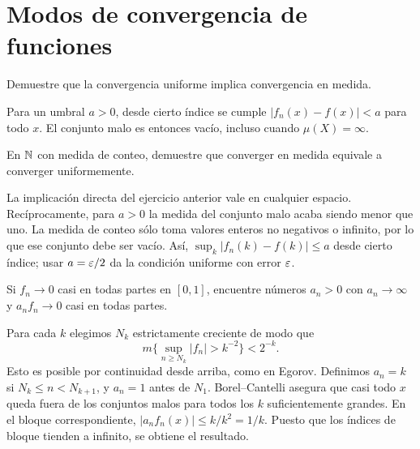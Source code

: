 \chapter{Modos de convergencia de funciones}

\begin{ejercicio}\label{ej:v2-l14-1}
Demuestre que la convergencia uniforme implica convergencia en medida.
\end{ejercicio}
\begin{solucion}
Para un umbral $a>0$, desde cierto índice se cumple $|f_n(x)-f(x)|<a$ para todo $x$. El conjunto malo es entonces vacío, incluso cuando $\mu(X)=\infty$.
\end{solucion}

\begin{ejercicio}\label{ej:v2-l14-2}
En $\mathbb N$ con medida de conteo, demuestre que converger en medida equivale a converger uniformemente.
\end{ejercicio}
\begin{solucion}
La implicación directa del ejercicio anterior vale en cualquier espacio. Recíprocamente, para $a>0$ la medida del conjunto malo acaba siendo menor que uno. La medida de conteo sólo toma valores enteros no negativos o infinito, por lo que ese conjunto debe ser vacío. Así, $\sup_k|f_n(k)-f(k)|\le a$ desde cierto índice; usar $a=\varepsilon/2$ da la condición uniforme con error $\varepsilon$.
\end{solucion}

\begin{ejercicio}\label{ej:v2-l14-3}
Si $f_n\to0$ casi en todas partes en $[0,1]$, encuentre números $a_n>0$ con $a_n\to\infty$ y $a_nf_n\to0$ casi en todas partes.
\end{ejercicio}
\begin{solucion}
Para cada $k$ elegimos $N_k$ estrictamente creciente de modo que
\[m\{\sup_{n\ge N_k}|f_n|>k^{-2}\}<2^{-k}.
\]
Esto es posible por continuidad desde arriba, como en Egorov. Definimos $a_n=k$ si $N_k\le n<N_{k+1}$, y $a_n=1$ antes de $N_1$. Borel--Cantelli asegura que casi todo $x$ queda fuera de los conjuntos malos para todos los $k$ suficientemente grandes. En el bloque correspondiente, $|a_nf_n(x)|\le k/k^2=1/k$. Puesto que los índices de bloque tienden a infinito, se obtiene el resultado.
\end{solucion}

